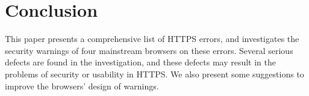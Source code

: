 \section{Conclusion}
This paper presents a comprehensive list of HTTPS errors,
 and investigates the security warnings of four mainstream browsers on these errors.
Several  serious defects are found in the investigation,
 and these defects may result in the problems of security or usability in HTTPS.
We also present some suggestions to improve the browsers' design of warnings.

